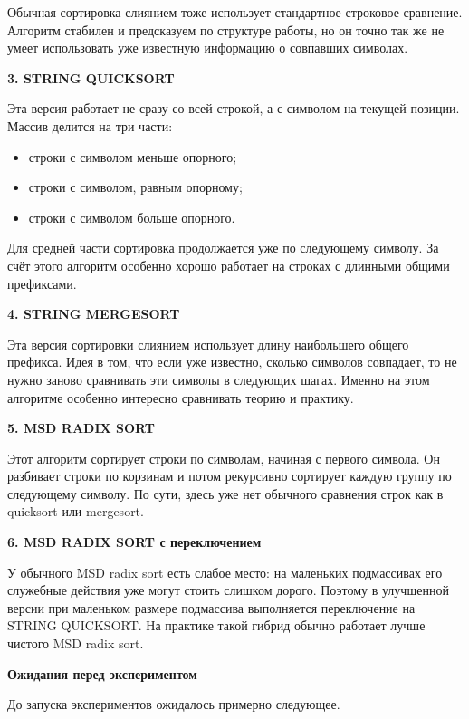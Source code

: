 \documentclass[12pt,a4paper]{article}
\begin{document}
Обычная сортировка слиянием тоже использует стандартное строковое сравнение.  
Алгоритм стабилен и предсказуем по структуре работы, но он точно так же не умеет использовать уже известную информацию о совпавших символах.

\medskip

\textbf{3. STRING QUICKSORT}

Эта версия работает не сразу со всей строкой, а с символом на текущей позиции.  
Массив делится на три части:
\begin{itemize}
    \item строки с символом меньше опорного;
    \item строки с символом, равным опорному;
    \item строки с символом больше опорного.
\end{itemize}

Для средней части сортировка продолжается уже по следующему символу.  
За счёт этого алгоритм особенно хорошо работает на строках с длинными общими префиксами.

\medskip

\textbf{4. STRING MERGESORT}

Эта версия сортировки слиянием использует длину наибольшего общего префикса.  
Идея в том, что если уже известно, сколько символов совпадает, то не нужно заново сравнивать эти символы в следующих шагах.  
Именно на этом алгоритме особенно интересно сравнивать теорию и практику.

\medskip

\textbf{5. MSD RADIX SORT}

Этот алгоритм сортирует строки по символам, начиная с первого символа.  
Он разбивает строки по корзинам и потом рекурсивно сортирует каждую группу по следующему символу.  
По сути, здесь уже нет обычного сравнения строк как в quicksort или mergesort.

\medskip

\textbf{6. MSD RADIX SORT с переключением}

У обычного MSD radix sort есть слабое место: на маленьких подмассивах его служебные действия уже могут стоить слишком дорого.  
Поэтому в улучшенной версии при маленьком размере подмассива выполняется переключение на STRING QUICKSORT.  
На практике такой гибрид обычно работает лучше чистого MSD radix sort.

\bigskip

\textbf{Ожидания перед экспериментом}

До запуска экспериментов ожидалось примерно следующее.
\end{document}
